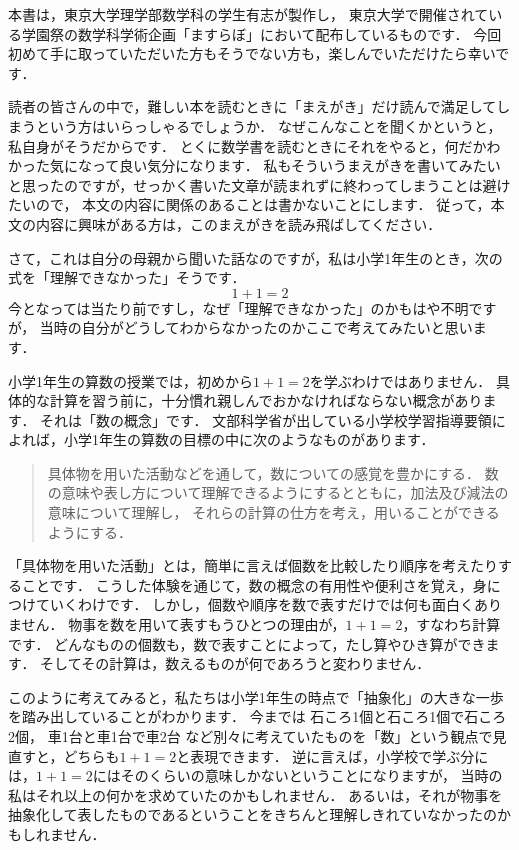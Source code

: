 
本書は，東京大学理学部数学科の学生有志が製作し，
東京大学で開催されている学園祭の数学科学術企画「ますらぼ」において配布しているものです．
今回初めて手に取っていただいた方もそうでない方も，楽しんでいただけたら幸いです．

読者の皆さんの中で，難しい本を読むときに「まえがき」だけ読んで満足してしまうという方はいらっしゃるでしょうか．
なぜこんなことを聞くかというと，私自身がそうだからです．
とくに数学書を読むときにそれをやると，何だかわかった気になって良い気分になります．
私もそういうまえがきを書いてみたいと思ったのですが，せっかく書いた文章が読まれずに終わってしまうことは避けたいので，
本文の内容に関係のあることは書かないことにします．
従って，本文の内容に興味がある方は，このまえがきを読み飛ばしてください．

さて，これは自分の母親から聞いた話なのですが，私は小学1年生のとき，次の式を「理解できなかった」そうです．
\[ 1+1=2 \]
今となっては当たり前ですし，なぜ「理解できなかった」のかもはや不明ですが，
当時の自分がどうしてわからなかったのかここで考えてみたいと思います．

小学1年生の算数の授業では，初めから$1+1=2$を学ぶわけではありません．
具体的な計算を習う前に，十分慣れ親しんでおかなければならない概念があります．
それは「数の概念」です．
文部科学省が出している小学校学習指導要領によれば，小学1年生の算数の目標の中に次のようなものがあります．
\begin{quote}
具体物を用いた活動などを通して，数についての感覚を豊かにする．
数の意味や表し方について理解できるようにするとともに，加法及び減法の意味について理解し，
それらの計算の仕方を考え，用いることができるようにする．
\end{quote}
「具体物を用いた活動」とは，簡単に言えば個数を比較したり順序を考えたりすることです．
こうした体験を通じて，数の概念の有用性や便利さを覚え，身につけていくわけです．
しかし，個数や順序を数で表すだけでは何も面白くありません．
物事を数を用いて表すもうひとつの理由が，$1+1=2$，すなわち計算です．
どんなものの個数も，数で表すことによって，たし算やひき算ができます．
そしてその計算は，数えるものが何であろうと変わりません．

このように考えてみると，私たちは小学1年生の時点で「抽象化」の大きな一歩を踏み出していることがわかります．
今までは
石ころ1個と石ころ1個で石ころ2個，
車1台と車1台で車2台
など別々に考えていたものを「数」という観点で見直すと，どちらも$1+1=2$と表現できます．
逆に言えば，小学校で学ぶ分には，$1+1=2$にはそのくらいの意味しかないということになりますが，
当時の私はそれ以上の何かを求めていたのかもしれません．
あるいは，それが物事を抽象化して表したものであるということをきちんと理解しきれていなかったのかもしれません．

